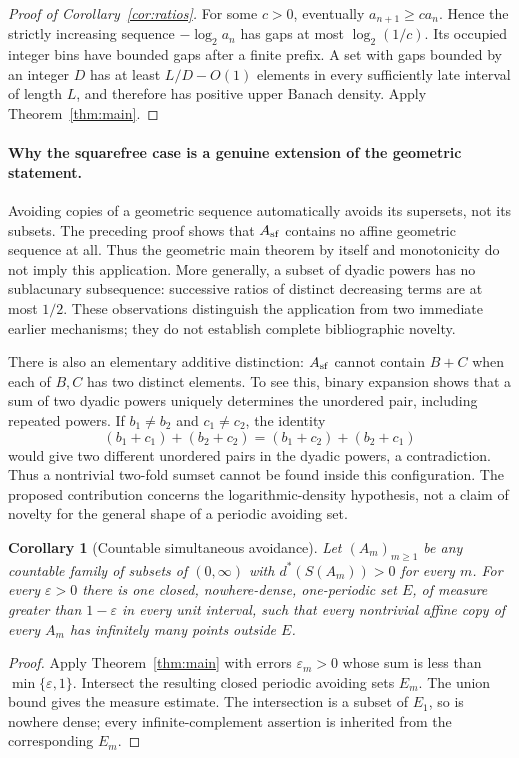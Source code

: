 \documentclass[11pt]{article}
\newtheorem{corollary}[theorem]{Corollary}
\theoremstyle{remark}\newtheorem{remark}[theorem]{Remark}
\begin{document}
\begin{proof}[Proof of Corollary~\ref{cor:ratios}]
For some $c>0$, eventually $a_{n+1}\ge c a_n$. Hence the strictly increasing sequence $-\log_2 a_n$ has gaps at most $\log_2(1/c)$. Its occupied integer bins have bounded gaps after a finite prefix. A set with gaps bounded by an integer $D$ has at least $L/D-O(1)$ elements in every sufficiently late interval of length $L$, and therefore has positive upper Banach density. Apply Theorem~\ref{thm:main}.
\end{proof}

\paragraph{Why the squarefree case is a genuine extension of the geometric statement.}
Avoiding copies of a geometric sequence automatically avoids its supersets, not its subsets. The preceding proof shows that $A_{\rm sf}$ contains no affine geometric sequence at all. Thus the geometric main theorem by itself and monotonicity do not imply this application. More generally, a subset of dyadic powers has no sublacunary subsequence: successive ratios of distinct decreasing terms are at most $1/2$. These observations distinguish the application from two immediate earlier mechanisms; they do not establish complete bibliographic novelty.

There is also an elementary additive distinction: $A_{\rm sf}$ cannot contain $B+C$ when each of $B,C$ has two distinct elements. To see this, binary expansion shows that a sum of two dyadic powers uniquely determines the unordered pair, including repeated powers. If $b_1\ne b_2$ and $c_1\ne c_2$, the identity
\[
 (b_1+c_1)+(b_2+c_2)=(b_1+c_2)+(b_2+c_1)
\]
would give two different unordered pairs in the dyadic powers, a contradiction. Thus a nontrivial two-fold sumset cannot be found inside this configuration. The proposed contribution concerns the logarithmic-density hypothesis, not a claim of novelty for the general shape of a periodic avoiding set.


\begin{corollary}[Countable simultaneous avoidance]\label{cor:countable}
Let $(A_m)_{m\ge1}$ be any countable family of subsets of $(0,\infty)$
with $d^*(S(A_m))>0$ for every $m$. For every $\varepsilon>0$ there
is one closed, nowhere-dense, one-periodic set $E$, of measure greater
than $1-\varepsilon$ in every unit interval, such that every
nontrivial affine copy of every $A_m$ has infinitely many points outside
$E$.
\end{corollary}
\begin{proof}
Apply Theorem~\ref{thm:main} with errors $\varepsilon_m>0$ whose sum
is less than $\min\{\varepsilon,1\}$. Intersect the resulting closed
periodic avoiding sets $E_m$. The union bound gives the measure
estimate. The intersection is a subset of $E_1$, so is nowhere dense;
every infinite-complement assertion is inherited from the corresponding
$E_m$.
\end{proof}
\end{document}
